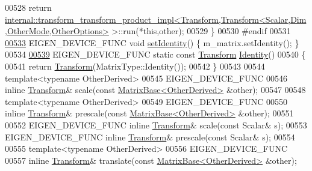 \begin{DoxyCode}
00528     \textcolor{keywordflow}{return} 
      \hyperlink{struct_eigen_1_1internal_1_1transform__transform__product__impl}{internal::transform\_transform\_product\_impl<Transform,Transform<Scalar,Dim,OtherMode,OtherOptions>}
       >::run(*\textcolor{keyword}{this},other);
00529   \}
00530 \textcolor{preprocessor}{  #endif}
00531 
\hyperlink{group___geometry___module_a4f0c6b74994904b56b621cf3d9ac4a0f}{00533}   EIGEN\_DEVICE\_FUNC \textcolor{keywordtype}{void} \hyperlink{group___geometry___module_a4f0c6b74994904b56b621cf3d9ac4a0f}{setIdentity}() \{ m\_matrix.setIdentity(); \}
00534 
\hyperlink{group___geometry___module_a41e2e58b09790eb8e3e220acceb7de1f}{00539}   EIGEN\_DEVICE\_FUNC \textcolor{keyword}{static} \textcolor{keyword}{const} \hyperlink{group___geometry___module_class_eigen_1_1_transform}{Transform} \hyperlink{group___geometry___module_a41e2e58b09790eb8e3e220acceb7de1f}{Identity}()
00540   \{
00541     \textcolor{keywordflow}{return} \hyperlink{group___geometry___module_class_eigen_1_1_transform}{Transform}(MatrixType::Identity());
00542   \}
00543 
00544   \textcolor{keyword}{template}<\textcolor{keyword}{typename} OtherDerived>
00545   EIGEN\_DEVICE\_FUNC 
00546   \textcolor{keyword}{inline} \hyperlink{group___geometry___module_class_eigen_1_1_transform}{Transform}& scale(\textcolor{keyword}{const} \hyperlink{group___core___module_class_eigen_1_1_matrix_base}{MatrixBase<OtherDerived>} &other);
00547 
00548   \textcolor{keyword}{template}<\textcolor{keyword}{typename} OtherDerived>
00549   EIGEN\_DEVICE\_FUNC
00550   \textcolor{keyword}{inline} \hyperlink{group___geometry___module_class_eigen_1_1_transform}{Transform}& prescale(\textcolor{keyword}{const} \hyperlink{group___core___module_class_eigen_1_1_matrix_base}{MatrixBase<OtherDerived>} &other);
00551 
00552   EIGEN\_DEVICE\_FUNC \textcolor{keyword}{inline} \hyperlink{group___geometry___module_class_eigen_1_1_transform}{Transform}& scale(\textcolor{keyword}{const} Scalar& s);
00553   EIGEN\_DEVICE\_FUNC \textcolor{keyword}{inline} \hyperlink{group___geometry___module_class_eigen_1_1_transform}{Transform}& prescale(\textcolor{keyword}{const} Scalar& s);
00554 
00555   \textcolor{keyword}{template}<\textcolor{keyword}{typename} OtherDerived>
00556   EIGEN\_DEVICE\_FUNC
00557   \textcolor{keyword}{inline} \hyperlink{group___geometry___module_class_eigen_1_1_transform}{Transform}& translate(\textcolor{keyword}{const} \hyperlink{group___core___module_class_eigen_1_1_matrix_base}{MatrixBase<OtherDerived>} &other);

\end{DoxyCode}
